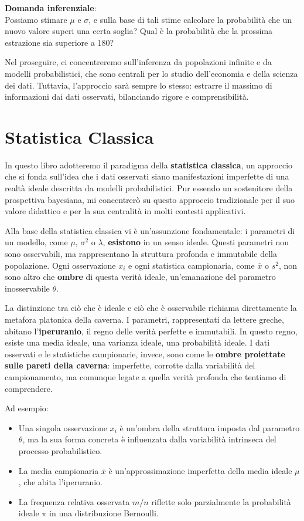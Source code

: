 \documentclass[
  11pt,
]{book}
\providecommand{\tightlist}{%
  \setlength{\itemsep}{0pt}\setlength{\parskip}{0pt}}
\theoremstyle{mytheoremstyle}
\theoremstyle{mydefstyle}
\begin{document}
\textbf{Domanda inferenziale}:\\
Possiamo stimare \(\mu\) e \(\sigma\), e sulla base di tali stime calcolare la probabilità che un nuovo valore superi una certa soglia?
Qual è la probabilità che la prossima estrazione sia superiore a 180?

Nel proseguire, ci concentreremo sull'inferenza da popolazioni infinite e da modelli probabilistici, che sono centrali per lo studio dell'economia e della scienza dei dati. Tuttavia, l'approccio sarà sempre lo stesso: estrarre il massimo di informazioni dai dati osservati, bilanciando rigore e comprensibilità.

\section{Statistica Classica}\label{statistica-classica}

In questo libro adotteremo il paradigma della \textbf{statistica classica}, un approccio che si fonda sull'idea che i dati osservati siano manifestazioni imperfette di una realtà ideale descritta da modelli probabilistici. Pur essendo un sostenitore della prospettiva bayesiana, mi concentrerò su questo approccio tradizionale per il suo valore didattico e per la sua centralità in molti contesti applicativi.

Alla base della statistica classica vi è un'assunzione fondamentale: i parametri di un modello, come \(\mu\), \(\sigma^2\) o \(\lambda\), \textbf{esistono} in un senso ideale. Questi parametri non sono osservabili, ma rappresentano la struttura profonda e immutabile della popolazione. Ogni osservazione \(x_i\) e ogni statistica campionaria, come \(\bar{x}\) o \(s^2\), non sono altro che \textbf{ombre} di questa verità ideale, un'emanazione del parametro inosservabile \(\theta\).

La distinzione tra ciò che è ideale e ciò che è osservabile richiama direttamente la metafora platonica della caverna. I parametri, rappresentati da lettere greche, abitano l'\textbf{iperuranio}, il regno delle verità perfette e immutabili. In questo regno, esiste una media ideale, una varianza ideale, una probabilità ideale. I dati osservati e le statistiche campionarie, invece, sono come le \textbf{ombre proiettate sulle pareti della caverna}: imperfette, corrotte dalla variabilità del campionamento, ma comunque legate a quella verità profonda che tentiamo di comprendere.

Ad esempio:

\begin{itemize}
\tightlist
\item
  Una singola osservazione \(x_i\) è un'ombra della struttura imposta dal parametro \(\theta\), ma la sua forma concreta è influenzata dalla variabilità intrinseca del processo probabilistico.
\item
  La media campionaria \(\bar{x}\) è un'approssimazione imperfetta della media ideale \(\mu\), che abita l'iperuranio.
\item
  La frequenza relativa osservata \(m/n\) riflette solo parzialmente la probabilità ideale \(\pi\) in una distribuzione Bernoulli.
\end{itemize}
\end{document}
